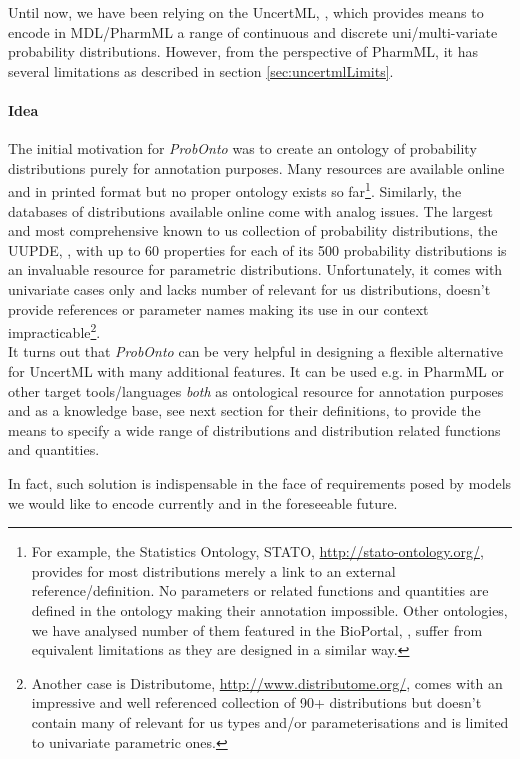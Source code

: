 Until now, we have been relying on the UncertML, \cite{uncertml3:2014}, 
which provides means to encode in MDL/PharmML a range of continuous and 
discrete uni/multi-variate probability distributions. However, from the perspective 
of PharmML, it has several limitations as described in section \ref{sec:uncertmlLimits}. 

\paragraph{Idea} The initial motivation for \emph{ProbOnto} was to create an ontology of probability 
distributions purely for annotation purposes. Many resources are available online 
and in printed format but no proper ontology exists so far\footnote{For 
example, the Statistics Ontology, STATO, \url{http://stato-ontology.org/}, provides 
for most distributions merely a link to an external reference/definition. No parameters
or related functions and quantities are defined in the ontology making their annotation
impossible. Other ontologies, we have analysed number of them featured in the 
BioPortal, \cite{noy2009bioportal}, suffer from equivalent limitations
as they are designed in a similar way.}.  
Similarly, the databases of distributions available online come with analog issues. 
The largest and most comprehensive known to us collection of probability distributions, the 
UUPDE, \cite{UUPDE:2013}, with up to 60 properties for each of its 
500 probability distributions is an invaluable resource for parametric distributions. 
Unfortunately, it comes with univariate cases only and lacks number of relevant for us 
distributions, doesn't provide references or parameter names making its use in our 
context impracticable\footnote{Another case is Distributome, 
\url{http://www.distributome.org/}, comes with an impressive and well referenced collection
of 90+ distributions but doesn't contain many of relevant for us types and/or 
parameterisations and is limited to univariate parametric ones.}. \\
It turns out that \emph{ProbOnto} can be very helpful in designing a flexible 
alternative for UncertML with many additional features.
It can be used e.g. in PharmML or other target tools/languages \emph{both} 
as ontological resource for annotation purposes and as a knowledge base, 
see next section for their definitions, to provide the means to specify a wide range 
of distributions and distribution related functions and quantities.

In fact, such solution is indispensable in the face of requirements 
posed by models we would like to encode currently and in the foreseeable future. 

